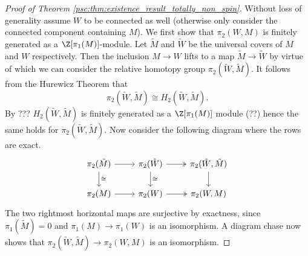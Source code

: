 \begin{proof}[Proof of Theorem \ref{psc:thm:existence_result_totally_non_spin}]
    {\color{red}
    Without loss of generality assume $W$ to be connected as well (otherwise only consider the connected component containing $M$).
    We first show that $\pi_2(W,M)$ is finitely generated as a $\Z[\pi_1(M)]$-module. Let $\tilde{M}$ and $\tilde{W}$ be the universal covers of $M$ and $W$ respectively. Then the inclusion $M \to W$ lifts to a map $\tilde{M} \to \tilde{W}$ by virtue of which we can consider the relative homotopy group $\pi_2(\tilde{W},\tilde{M})$. It follows from the Hurewicz Theorem that 
    \[
    \pi_2(\tilde{W},\tilde{M}) \cong H_2(\tilde{W},\tilde{M}).
    \]
    By ??? $H_2(\tilde{W},\tilde{M})$ is finitely generated as a $\Z[\pi_1(M)]$ module (??) hence the same holds for $\pi_2(\tilde{W},\tilde{M})$. Now consider the following diagram where the rows are exact.
    \[\begin{tikzcd}
	{\pi_2(\tilde{M})} & {\pi_2(\tilde{W})} & {\pi_2(\tilde{W},\tilde{M})} \\
	{\pi_2(M)} & {\pi_2(W)} & {\pi_2(W,M)}
	\arrow[from=1-1, to=1-2]
	\arrow["\cong", from=1-1, to=2-1]
	\arrow[two heads, from=1-2, to=1-3]
	\arrow["\cong", from=1-2, to=2-2]
	\arrow[from=1-3, to=2-3]
	\arrow[from=2-1, to=2-2]
	\arrow[two heads, from=2-2, to=2-3]
\end{tikzcd}\]
The two rightmost horizontal maps are surjective by exactness, since $\pi_1(\tilde{M}) = 0$ and $\pi_1(M) \to \pi_1(W)$ is an isomorphism. A diagram chase now shows that $\pi_2(\tilde{W},\tilde{M}) \to \pi_2(W,M)$ is an isomorphism.}
    

\end{proof}
